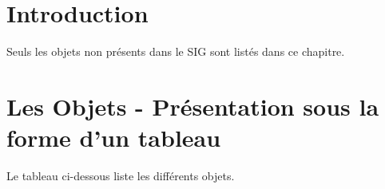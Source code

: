 \documentclass[12pt,titlepage,oneside]{book}
\begin{document}
\section{Introduction}
Seuls les objets non présents dans le SIG sont listés dans ce chapitre.


\section{Les Objets - Présentation sous la forme d'un tableau}
Le tableau ci-dessous liste les différents objets.
\vspace{\baselineskip}
\end{document}
